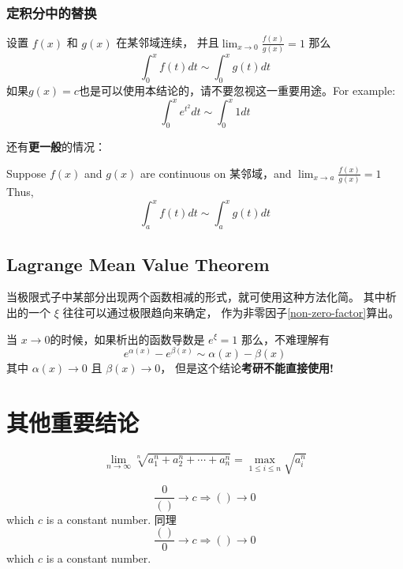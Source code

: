 \subsubsection{定积分中的替换}
\label{limit-rerepresenting-in-variable-limits-integral}
设置 $f(x)$ 和 $g(x)$ 在某邻域连续，
并且$\lim_{x \to 0} \frac{f(x)}{g(x)} = 1$
那么
\begin{equation}
	\int_0^{x} f(t) dt \sim \int_0^{x} g(t) dt
\end{equation}
如果$g(x)=c$也是可以使用本结论的，请不要忽视这一重要用途。For example:
\[
\int_0^x e^{t^2} dt \sim \int_0^{x} 1 dt
\]

还有\textbf{更一般}的情况：
\begin{lemma}
	Suppose $f(x)$ and $g(x)$ are continuous on 某邻域，and $\lim_{x \to a} \frac{f(x)}{g(x)} = 1$ 
	Thus, 
	\begin{equation}
		\int_a^{x} f(t) dt \sim \int_a^{x} g(t) dt
	\end{equation}
\end{lemma}

\subsection{Lagrange Mean Value Theorem} \label{lagrange-limit}
当极限式子中某部分出现两个函数相减的形式，就可使用这种方法化简。
其中析出的一个 $\xi$ 往往可以通过极限趋向来确定，
作为非零因子\ref{non-zero-factor}算出。

当 $x\to0$的时候，如果析出的函数导数是 $e^{\xi} = 1$ 那么，不难理解有
\begin{equation}
	e^{\alpha(x)} - e^{\beta(x)} \sim \alpha(x) - \beta(x)
\end{equation}
其中 $\alpha(x) \to 0$ 且 $\beta(x) \to 0$，
但是这个结论\textbf{考研不能直接使用!}

\section{其他重要结论}
\begin{lemma}
	\begin{equation}
		\lim_{n \to \infty} \sqrt[n]{a^{n}_{1} + a^{n}_{2} + 
        \cdots + a^{n}_{n}} = \max_{1\leq i \leq n}{\sqrt{a_{i}^{n}}}
	\end{equation}
\end{lemma}

\begin{lemma}
    \begin{equation}
        \frac{0}{()} \to c \Rightarrow () \to 0
    \end{equation}
    which $c$ is a constant number.
    同理
    \begin{equation}
        \frac{()}{0} \to c \Rightarrow () \to 0
    \end{equation}
    which $c$ is a constant number.
\end{lemma}

